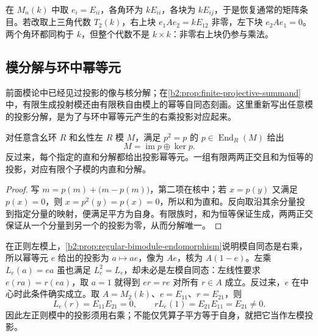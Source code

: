 \ProseParagraphBreak
在 \(M_n(k)\) 中取 \(e_i=E_{ii}\)，各角环为 \(kE_{ii}\)，各块为 \(kE_{ij}\)，于是恢复通常的矩阵条目。若改取上三角代数 \(T_2(k)\)，右上块 \(e_1Ae_2=kE_{12}\) 非零，左下块 \(e_2Ae_1=0\)。两个角环都同构于 \(k\)，但整个代数不是 \(k\times k\)：非零右上块仍参与乘法。

\subsection{模分解与环中幂等元}
\label{b2:subsec:1103:03}

前面模论中已经见过投影的像与核分解；在\cref{b2:prop:finite-projective-summand}中，有限生成投射模还由有限秩自由模上的幂等自同态刻画。这里重新写出任意模的投影分解，是为了与环中幂等元产生的右乘投影对应起来。

\begin{proposition}\label{b2:prop:idempotent-module-decomposition}
	对任意含幺环 \(R\) 和幺性左 \(R\) 模 \(M\)，满足 \(p^2=p\) 的 \(p\in\operatorname{End}_R(M)\) 给出
	\[
		M=\operatorname{im}p\oplus\ker p.
	\]
	反过来，每个指定的直和分解都给出投影幂等元。一组有限两两正交且和为恒等的投影，对应有限个子模的内直和分解。
\end{proposition}
\begin{proof}
	写 \(m=p(m)+\bigl(m-p(m)\bigr)\)，第二项在核中；若 \(x=p(y)\) 又满足 \(p(x)=0\)，则 \(x=p^2(y)=p(x)=0\)，所以和为直和。反向取沿其余分量投到指定分量的映射，便满足平方为自身。有限族时，和为恒等保证生成，两两正交保证从一个分量到另一个的投影为零，从而分解唯一。
\end{proof}

在正则左模上，\cref{b2:prop:regular-bimodule-endomorphism}说明模自同态是右乘，所以幂等元 \(e\) 给出的投影为 \(a\mapsto ae\)，像为 \(Ae\)，核为 \(A(1-e)\)。左乘 \(L_e(a)=ea\) 虽也满足 \(L_e^2=L_e\)，却未必是左模自同态：左线性要求 \(e(ra)=r(ea)\)，取 \(a=1\) 就得到 \(er=re\) 对所有 \(r\in A\) 成立。反过来，\(e\) 在中心时此条件确实成立。取 \(A=M_2(k)\)、\(e=E_{11}\)、\(r=E_{21}\)，则
\[
	L_e(r)=E_{11}E_{21}=0, \qquad rL_e(1)=E_{21}E_{11}=E_{21}\ne0.
\]
因此左正则模中的投影须用右乘；不能仅凭算子平方等于自身，就把它当作左模投影。

